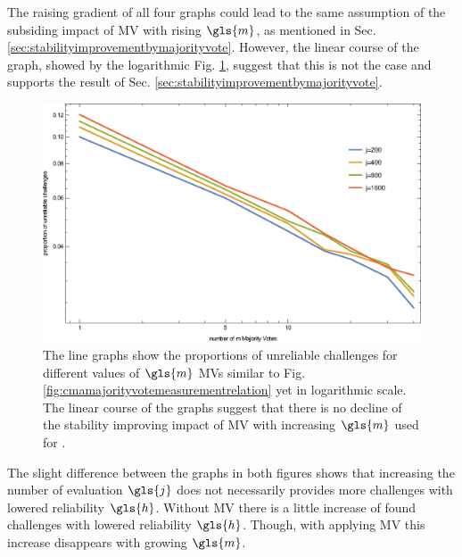 The raising gradient of all four graphs could lead to the same assumption of the subsiding impact of \ac{MV} with rising $\gls{m}$, as mentioned in Sec. \ref{sec:stabilityimprovementbymajorityvote}.
However, the linear course of the graph, showed by the logarithmic Fig. \ref{fig:cmamajorityvotemeasurementrelationloglog}, suggest that this is not the case and supports the result of Sec. \ref{sec:stabilityimprovementbymajorityvote}.

\begin{figure}[ht]
\includegraphics[width=1.00\textwidth]{images/mv-measurements-unstableChallenges_loglog.eps}
\caption[Proportion of unreliable challenges logarithmic]{The line graphs show the proportions of unreliable challenges for different values of $\gls{m}$ \acp{MV} similar to Fig. \ref{fig:cmamajorityvotemeasurementrelation} yet in logarithmic scale. The linear course of the graphs suggest that there is no decline of the stability improving impact of \ac{MV} with increasing $\gls{m}$ used for \mpufs.}
\label{fig:cmamajorityvotemeasurementrelationloglog}
\end{figure}

The slight difference between the graphs in both figures shows that increasing the number of evaluation $\gls{j}$ does not necessarily provides more challenges with lowered reliability $\gls{h}$.
Without \ac{MV} there is a little increase of found challenges with lowered reliability $\gls{h}$.
Though, with applying \ac{MV} this increase disappears with growing $\gls{m}$.

